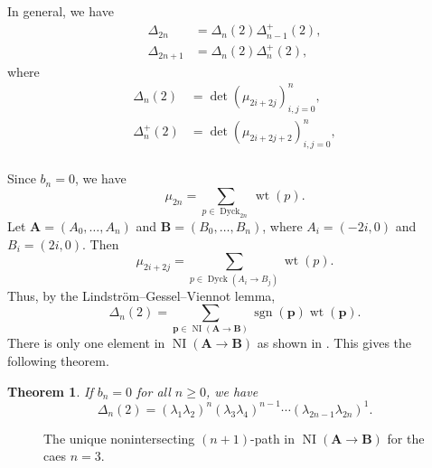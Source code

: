 \documentclass[oneside]{book}
\numberwithin{equation}{section}
\newtheorem{thm}{Theorem}[section]
\theoremstyle{definition}
\newcommand\NI{\operatorname{NI}}
\newcommand\sgn{\operatorname{sgn}}
\newcommand{\Dyck}{\operatorname{Dyck}}
\newcommand\wt{\operatorname{wt}}
\renewcommand\vec[1]{\mathbf{#1}}
\newcommand\dlabel[3]{\node at (#1+0.7,#2-0.3) {\( #3 \)};}
\begin{document}
In general, we have
\begin{align}
\label{eq:40}  \Delta_{2n} &= \Delta_n(2) \Delta^+_{n-1}(2),\\
  \Delta_{2n+1} &= \Delta_n(2) \Delta^+_{n}(2),
\end{align}
where
\begin{align*}
  \Delta_n(2) &= \det \left( \mu_{2i+2j} \right)_{i,j=0}^n,\\
  \Delta^+_n(2) &= \det \left( \mu_{2i+2j+2} \right)_{i,j=0}^n,\\
\end{align*}

Since \( b_n=0 \), we have
\[
  \mu_{2n} = \sum_{p\in \Dyck_{2n}} \wt(p).
\]
Let \( \vec A = (A_0,\dots,A_n) \) and \( \vec B = (B_0,\dots,B_n) \),
where \( A_i = (-2i,0) \) and \( B_i = (2i,0) \). Then
\[
  \mu_{2i+2j} = \sum_{p\in \Dyck(A_i\to B_j)} \wt(p). 
\]
Thus, by the Lindstr\"om--Gessel--Viennot lemma,
\[
  \Delta_n(2) = \sum_{\vec p \in \NI(\vec A \to \vec B)} \sgn(\vec p) \wt(\vec p).
\]
There is only one element in \( \NI(\vec A \to \vec B) \) as shown in
.
This gives the following theorem.

\begin{thm}\label{thm:11}
  If \( b_n=0 \) for all \( n\ge0 \), we have
\[
  \Delta_n(2) = (\lambda_1\lambda_2)^n (\lambda_3\lambda_4)^{n-1}
  \cdots  (\lambda_{2n-1}\lambda_{2n})^1.
\]
\end{thm}

\begin{figure}
  \centering
{}
\caption{The unique nonintersecting \( (n+1) \)-path in
  \( \NI(\vec A \to \vec B) \) for the caes \( n=3 \).}
\label{fig:16}
\end{figure}
\end{document}
